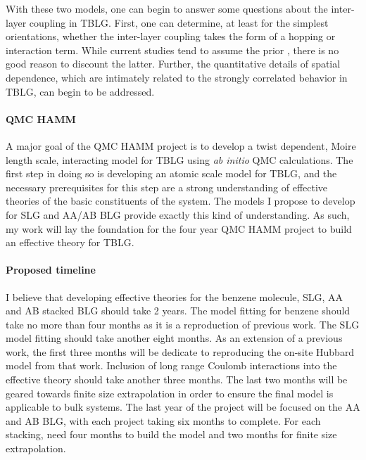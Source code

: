 \documentclass[12pt]{article}
\begin{document}
With these two models, one can begin to answer some questions about the inter-layer coupling in TBLG.
First, one can determine, at least for the simplest orientations, whether the inter-layer coupling takes the form of a hopping or interaction term.
While current studies tend to assume the prior \cite{Fang, Fang2016, PhysRevX.8.031088, PhysRevX.8.031087}, there is no good reason to discount the latter.
Further, the quantitative details of spatial dependence, which are intimately related to the strongly correlated behavior in TBLG, can begin to be addressed.

\vspace{-10pt}
\paragraph{QMC HAMM}
A major goal of the QMC HAMM project is to develop a twist dependent, Moire length scale, interacting model for TBLG using \textit{ab initio} QMC calculations.
The first step in doing so is developing an atomic scale model for TBLG, and the necessary prerequisites for this step are a strong understanding of effective theories of the basic constituents of the system.
The models I propose to develop for SLG and AA/AB BLG provide exactly this kind of understanding.
As such, my work will lay the foundation for the four year QMC HAMM project to build an effective theory for TBLG.

\vspace{-10pt}
\paragraph{Proposed timeline} I believe that developing effective theories for the benzene molecule, SLG, AA and AB stacked BLG should take 2 years. 
The model fitting for benzene should take no more than four months as it is a reproduction of previous work.
The SLG model fitting should take another eight months.
As an extension of a previous work, the first three months will be dedicate to reproducing the on-site Hubbard model from that work.
Inclusion of long range Coulomb interactions into the effective theory should take another three months.
The last two months will be geared towards finite size extrapolation in order to ensure the final model is applicable to bulk systems.
The last year of the project will be focused on the AA and AB BLG, with each project taking six months to complete.
For each stacking, need four months to build the model and two months for finite size extrapolation.


\vspace{-10pt}
\begin{multicols}{2}
\begin{spacing}{0.5}
{\footnotesize


}
\end{spacing}
\end{multicols}
\end{document}
